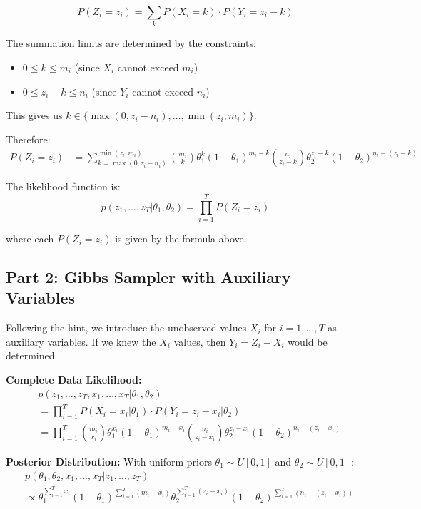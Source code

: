 \begin{equation}
P(Z_i = z_i) = \sum_{k} P(X_i = k) \cdot P(Y_i = z_i - k)
\end{equation}

The summation limits are determined by the constraints:
\begin{itemize}
\item $0 \leq k \leq m_i$ (since $X_i$ cannot exceed $m_i$)
\item $0 \leq z_i - k \leq n_i$ (since $Y_i$ cannot exceed $n_i$)
\end{itemize}

This gives us $k \in \{\max(0, z_i - n_i), \ldots, \min(z_i, m_i)\}$.

Therefore:
\begin{align}
P(Z_i = z_i) &= \sum_{k=\max(0,z_i-n_i)}^{\min(z_i,m_i)} \binom{m_i}{k} \theta_1^k (1-\theta_1)^{m_i-k} \binom{n_i}{z_i-k} \theta_2^{z_i-k} (1-\theta_2)^{n_i-(z_i-k)}
\end{align}

The likelihood function is:
\begin{equation}
\boxed{p(z_1, \ldots, z_T | \theta_1, \theta_2) = \prod_{i=1}^T P(Z_i = z_i)}
\end{equation}

where each $P(Z_i = z_i)$ is given by the formula above.

\subsection*{Part 2: Gibbs Sampler with Auxiliary Variables}

Following the hint, we introduce the unobserved values $X_i$ for $i = 1, \ldots, T$ as auxiliary variables. If we knew the $X_i$ values, then $Y_i = Z_i - X_i$ would be determined.

\textbf{Complete Data Likelihood:}
\begin{align}
&p(z_1, \ldots, z_T, x_1, \ldots, x_T | \theta_1, \theta_2)\\
&= \prod_{i=1}^T P(X_i = x_i | \theta_1) \cdot P(Y_i = z_i - x_i | \theta_2)\\
&= \prod_{i=1}^T \binom{m_i}{x_i} \theta_1^{x_i} (1-\theta_1)^{m_i-x_i} \binom{n_i}{z_i-x_i} \theta_2^{z_i-x_i} (1-\theta_2)^{n_i-(z_i-x_i)}
\end{align}

\textbf{Posterior Distribution:}
With uniform priors $\theta_1 \sim U[0,1]$ and $\theta_2 \sim U[0,1]$:
\begin{align}
&p(\theta_1, \theta_2, x_1, \ldots, x_T | z_1, \ldots, z_T)\\
&\propto \theta_1^{\sum_{i=1}^T x_i} (1-\theta_1)^{\sum_{i=1}^T (m_i-x_i)} \theta_2^{\sum_{i=1}^T (z_i-x_i)} (1-\theta_2)^{\sum_{i=1}^T (n_i-(z_i-x_i))}
\end{align}

